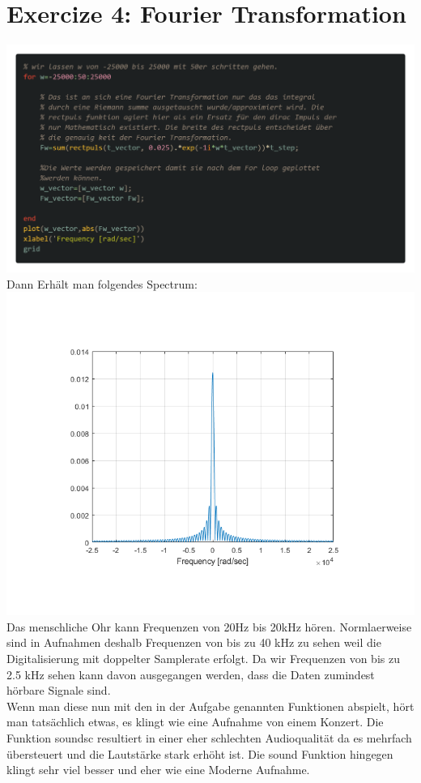 \documentclass{scrartcl}
\begin{document}
\section*{Exercize 4: Fourier Transformation}


\includegraphics[scale=0.26]{codem4.png}\\
Dann Erhält man folgendes Spectrum:\\

\includegraphics[scale=0.7]{spectrumM4.png}\\

Das menschliche Ohr kann Frequenzen von 20Hz bis 20kHz hören. Normlaerweise sind in Aufnahmen deshalb Frequenzen von bis zu 40 kHz zu sehen weil die Digitalisierung mit doppelter Samplerate erfolgt. Da wir Frequenzen von bis zu 2.5 kHz sehen kann davon ausgegangen werden, dass die Daten zumindest hörbare Signale sind.\\
Wenn man diese nun mit den in der Aufgabe genannten Funktionen abspielt, hört man tatsächlich etwas, es klingt wie eine Aufnahme von einem Konzert. Die Funktion soundsc resultiert in einer eher schlechten Audioqualität da es mehrfach übersteuert und die Lautstärke stark erhöht ist. Die sound Funktion hingegen klingt sehr viel besser und eher wie eine Moderne Aufnahme. 
\end{document}
